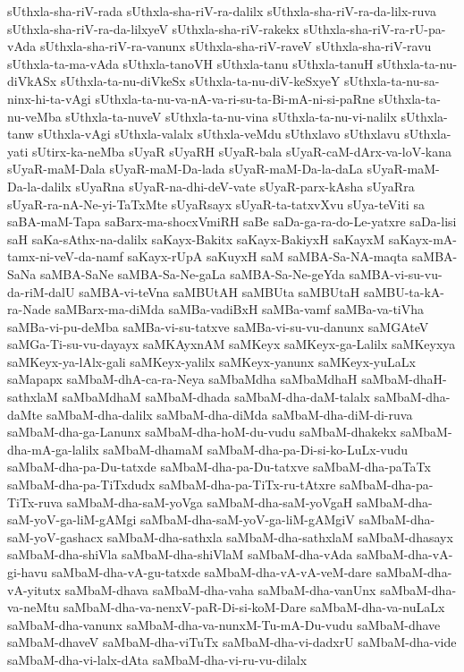 {sUthxla-sha-riV-rada
sUthxla-sha-riV-ra-dalilx
sUthxla-sha-riV-ra-da-lilx-ruva
sUthxla-sha-riV-ra-da-lilxyeV
sUthxla-sha-riV-rakekx
sUthxla-sha-riV-ra-rU-pa-vAda
sUthxla-sha-riV-ra-vanunx
sUthxla-sha-riV-raveV
sUthxla-sha-riV-ravu
sUthxla-ta-ma-vAda
sUthxla-tanoVH
sUthxla-tanu
sUthxla-tanuH
sUthxla-ta-nu-diVkASx
sUthxla-ta-nu-diVkeSx
sUthxla-ta-nu-diV-keSxyeY
sUthxla-ta-nu-sa-ninx-hi-ta-vAgi
sUthxla-ta-nu-va-nA-va-ri-su-ta-Bi-mA-ni-si-paRne
sUthxla-ta-nu-veMba
sUthxla-ta-nuveV
sUthxla-ta-nu-vina
sUthxla-ta-nu-vi-nalilx
sUthxla-tanw
sUthxla-vAgi
sUthxla-valalx
sUthxla-veMdu
sUthxlavo
sUthxlavu
sUthxla-yati
sUtirx-ka-neMba
sUyaR
sUyaRH
sUyaR-bala
sUyaR-caM-dArx-va-loV-kana
sUyaR-maM-Dala
sUyaR-maM-Da-lada
sUyaR-maM-Da-la-daLa
sUyaR-maM-Da-la-dalilx
sUyaRna
sUyaR-na-dhi-deV-vate
sUyaR-parx-kAsha
sUyaRra
sUyaR-ra-nA-Ne-yi-TaTxMte
sUyaRsayx
sUyaR-ta-tatxvXvu
sUya-teViti
sa
saBA-maM-Tapa
saBarx-ma-shocxVmiRH
saBe
saDa-ga-ra-do-Le-yatxre
saDa-lisi
saH
saKa-sAthx-na-dalilx
saKayx-Bakitx
saKayx-BakiyxH
saKayxM
saKayx-mA-tamx-ni-veV-da-namf
saKayx-rUpA
saKuyxH
saM
saMBA-Sa-NA-maqta
saMBA-SaNa
saMBA-SaNe
saMBA-Sa-Ne-gaLa
saMBA-Sa-Ne-geYda
saMBA-vi-su-vu-da-riM-dalU
saMBA-vi-teVna
saMBUtAH
saMBUta
saMBUtaH
saMBU-ta-kA-ra-Nade
saMBarx-ma-diMda
saMBa-vadiBxH
saMBa-vamf
saMBa-va-tiVha
saMBa-vi-pu-deMba
saMBa-vi-su-tatxve
saMBa-vi-su-vu-danunx
saMGAteV
saMGa-Ti-su-vu-dayayx
saMKAyxnAM
saMKeyx
saMKeyx-ga-Lalilx
saMKeyxya
saMKeyx-ya-lAlx-gali
saMKeyx-yalilx
saMKeyx-yanunx
saMKeyx-yuLaLx
saMapapx
saMbaM-dhA-ca-ra-Neya
saMbaMdha
saMbaMdhaH
saMbaM-dhaH-sathxlaM
saMbaMdhaM
saMbaM-dhada
saMbaM-dha-daM-talalx
saMbaM-dha-daMte
saMbaM-dha-dalilx
saMbaM-dha-diMda
saMbaM-dha-diM-di-ruva
saMbaM-dha-ga-Lanunx
saMbaM-dha-hoM-du-vudu
saMbaM-dhakekx
saMbaM-dha-mA-ga-lalilx
saMbaM-dhamaM
saMbaM-dha-pa-Di-si-ko-LuLx-vudu
saMbaM-dha-pa-Du-tatxde
saMbaM-dha-pa-Du-tatxve
saMbaM-dha-paTaTx
saMbaM-dha-pa-TiTxdudx
saMbaM-dha-pa-TiTx-ru-tAtxre
saMbaM-dha-pa-TiTx-ruva
saMbaM-dha-saM-yoVga
saMbaM-dha-saM-yoVgaH
saMbaM-dha-saM-yoV-ga-liM-gAMgi
saMbaM-dha-saM-yoV-ga-liM-gAMgiV
saMbaM-dha-saM-yoV-gashacx
saMbaM-dha-sathxla
saMbaM-dha-sathxlaM
saMbaM-dhasayx
saMbaM-dha-shiVla
saMbaM-dha-shiVlaM
saMbaM-dha-vAda
saMbaM-dha-vA-gi-havu
saMbaM-dha-vA-gu-tatxde
saMbaM-dha-vA-vA-veM-dare
saMbaM-dha-vA-yitutx
saMbaM-dhava
saMbaM-dha-vaha
saMbaM-dha-vanUnx
saMbaM-dha-va-neMtu
saMbaM-dha-va-nenxV-paR-Di-si-koM-Dare
saMbaM-dha-va-nuLaLx
saMbaM-dha-vanunx
saMbaM-dha-va-nunxM-Tu-mA-Du-vudu
saMbaM-dhave
saMbaM-dhaveV
saMbaM-dha-viTuTx
saMbaM-dha-vi-dadxrU
saMbaM-dha-vide
saMbaM-dha-vi-lalx-dAta
saMbaM-dha-vi-ru-vu-dilalx
}
